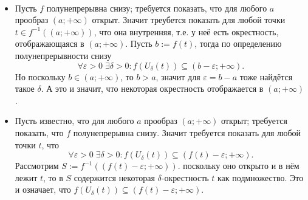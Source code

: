 \documentclass[12pt,a4paper]{article}
\begin{document}
    \begin{enumproblem}[\textcolor{green}{сдано}]\ 
        \begin{itemize}
            \item Пусть $f$ полунепрерывна снизу; требуется показать, что для любого $a$ прообраз $(a; +\infty)$ открыт. Значит треубется показать для любой точки $t \in f^{-1}((a;+\infty))$, что она внутренняя, т.е. у неё есть окрестность, отображающаяся в $(a; +\infty)$. Пусть $b := f(t)$, тогда по определению полунепрерывности снизу
            \[\forall \varepsilon > 0\; \exists \delta > 0: f(U_{\delta}(t))\subseteq(b-\varepsilon; +\infty).\]
            Но поскольку $b \in (a; +\infty)$, то $b > a$, значит для $\varepsilon = b - a$ тоже найдётся такое $\delta$. А это и значит, что некоторая окрестность отображается в $(a; +\infty)$.
            \item Пусть известно, что для любого $a$ прообраз $(a;+\infty)$ открыт; требуется показать, что $f$ полунепрерывна снизу. Значит требуется показать для любой точки $t$, что
            \[\forall \varepsilon > 0\; \exists \delta > 0: f(U_\delta(t))\subseteq(f(t)-\varepsilon;+\infty).\]
            Рассмотрим $S := f^{-1}((f(t)-\varepsilon;+\infty))$. поскольку оно открыто и в нём лежит $t$, то в $S$ содержится некоторая $\delta$-окрестность $t$ как подмножество. Это и означает, что $f(U_\delta(t))\subseteq(f(t)-\varepsilon;+\infty)$.
        \end{itemize}
    \end{enumproblem}
\end{document}
